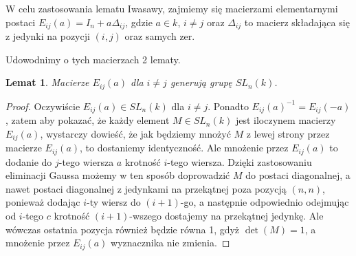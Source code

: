 \documentclass[licencjacka]{pracamgr}
\newtheorem{lemma}{Lemat}[section]
\begin{document}


W celu zastosowania lematu Iwasawy, zajmiemy się macierzami elementarnymi postaci
$E_{i j} (a) = I_n + a \Delta_{i j}$, gdzie $a \in k$, $i \ne j$ oraz 
$\Delta_{i j}$ to macierz składająca się z jedynki na pozycji $(i, j)$ oraz samych zer.

Udowodnimy o tych macierzach 2 lematy.

\begin{lemma}\label{lemma_Eij_generates_SL}
  Macierze $E_{i j}(a)$ dla $i \ne j$ generują grupę $SL_n(k)$.
\end{lemma}
\begin{proof}
  Oczywiście $E_{i j}(a) \in SL_n(k)$ dla $i \ne j$. 
  Ponadto $E_{i j}(a)^{-1} = E_{i j}(-a)$, zatem aby pokazać, że każdy element $M \in SL_n(k)$ jest iloczynem macierzy $E_{i j}(a)$,
  wystarczy dowieść, że jak będziemy mnożyć $M$ z lewej strony przez macierze $E_{i j}(a)$, to dostaniemy identyczność.
  Ale mnożenie przez $E_{i j}(a)$ to dodanie do $j$-tego wiersza $a$ krotność $i$-tego wiersza.
  Dzięki zastosowaniu eliminacji Gaussa możemy w ten sposób doprowadzić $M$ do postaci diagonalnej,
  a nawet postaci diagonalnej z jedynkami na przekątnej poza pozycją $(n, n)$, ponieważ dodając $i$-ty wiersz do $(i+1)$-go, a następnie odpowiednio
  odejmując od $i$-tego $c$ krotność $(i+1)$-wszego dostajemy na przekątnej jedynkę. Ale wówczas ostatnia pozycja również będzie równa 1, 
  gdyż $\det(M) = 1$, a mnożenie przez $E_{i j}(a)$ wyznacznika nie zmienia.
\end{proof}
\end{document}
